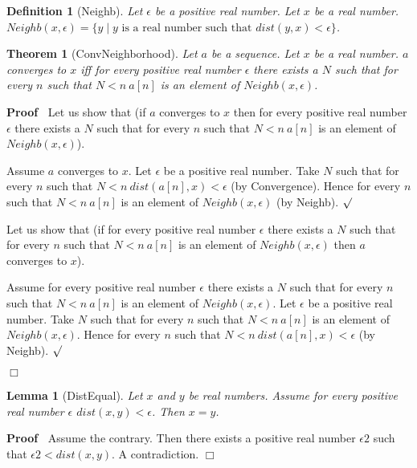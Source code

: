 \documentclass{article}
\newenvironment{forthel}{\begin{leftbar}}{\end{leftbar}}
\newenvironment{proof}{\noindent\textbf{Proof\ }}{\hspace*{\fill}$\Box$\medskip}
\newenvironment{subproof}{\begin{list}{}{}
		\item[\text{Proof}]}{\hfill $\surd$ \end{list}}
\newtheorem{lemma}{Lemma}
\newtheorem{theorem}{Theorem}
\newtheorem{definition}{Definition}
\begin{document}
\begin{forthel}
	\begin{definition}[Neighb]
	Let $\epsilon$ be a positive real number. Let $x$ be a real number.
	$Neighb(x,\epsilon) = \{y \mid y \text{ is a real number such that } dist(y,x) < \epsilon\}$.
	\end{definition}
	
	\begin{theorem}[ConvNeighborhood]
	Let $a$ be a sequence. Let $x$ be a real number.
	$a$ converges to $x$ iff for every positive real number $\epsilon$ there exists a $N$
	such that for every $n$ such that $N < n \ a[n]$ is an element of $Neighb(x,\epsilon)$.
	\end{theorem}
	\begin{proof}
	Let us show that (if $a$ converges to $x$ then for every positive real number $\epsilon$ there exists a $N$
	such that for every $n$ such that $N < n \ a[n]$ is an element of $Neighb(x,\epsilon)$).
	\begin{subproof}
	Assume $a$ converges to $x$.
	Let $\epsilon$ be a positive real number.
	Take $N$ such that for every $n$ such that $N < n \ dist(a[n],x) < \epsilon$ (by Convergence).
	Hence for every $n$ such that $N < n \ a[n]$ is an element of $Neighb(x,\epsilon)$ (by Neighb).
	\end{subproof}
	Let us show that (if for every positive real number $\epsilon$ there exists a $N$ such that
	for every $n$ such that $N < n \ a[n]$ is an element of $Neighb(x,\epsilon)$ then $a$ converges to $x$).
	\begin{subproof}
	Assume for every positive real number $\epsilon$ there exists a $N$ such that
	for every $n$ such that $N < n \ a[n]$ is an element of $Neighb(x,\epsilon)$.
	Let $\epsilon$ be a positive real number.
	Take $N$ such that for every $n$ such that $N < n \ a[n]$ is an element of $Neighb(x,\epsilon)$.
	Hence for every $n$ such that $N < n \ dist(a[n],x) < \epsilon$ (by Neighb).
	\end{subproof}
	\end{proof}	
	
	\begin{lemma}[DistEqual]
	Let $x$ and $y$ be real numbers. Assume for every positive real number $\epsilon$ $dist(x,y) < \epsilon$.
	Then $x = y$.
	\end{lemma}
	\begin{proof}
	Assume the contrary.
	Then there exists a positive real number $\epsilon2$ such that $\epsilon2 < dist(x,y)$.
	A contradiction.
	\end{proof}
	

\end{forthel}
\end{document}

